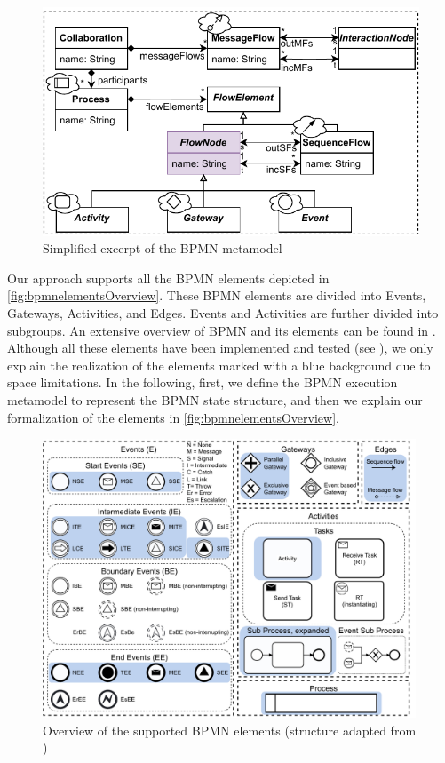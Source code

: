 \documentclass{lmcs} %
\begin{document}
\begin{figure}[ht]
  \centering
  \includegraphics[width=0.8\linewidth]{images/bpmn_semantics-bpmn-metamodel.pdf}
  \caption{Simplified excerpt of the BPMN metamodel \cite{objectmanagementgroupBusinessProcessModel2013}}
  \label{fig:bpmnMetamodel}
\end{figure}

Our approach supports all the BPMN elements depicted in \autoref{fig:bpmnelementsOverview}.
These BPMN elements are divided into \textsf{Events}, \textsf{Gateways}, \textsf{Activities}, and \textsf{Edges}.
\textsf{Events} and \textsf{Activities} are further divided into subgroups.
An extensive overview of BPMN and its elements can be found in \cite{freundRealLifeBPMNUsing2019}.
Although all these elements have been implemented and tested (see \cite{timkrauterLMCS2024Artifacts2023}), we only explain the realization of the elements marked with a blue background due to space limitations.
In the following, first, we define the BPMN execution metamodel to represent the BPMN state structure, and then we explain our formalization of the elements in \autoref{fig:bpmnelementsOverview}.


\begin{figure}[ht]
    \centering
    \includegraphics[width=0.99\textwidth]{images/bpmn_semantics-elements-overview.pdf}
    \caption{Overview of the supported BPMN elements (structure adapted from \cite{houhouFirstOrderLogicVerification2022})}
    \label{fig:bpmnelementsOverview}
\end{figure}
\end{document}
